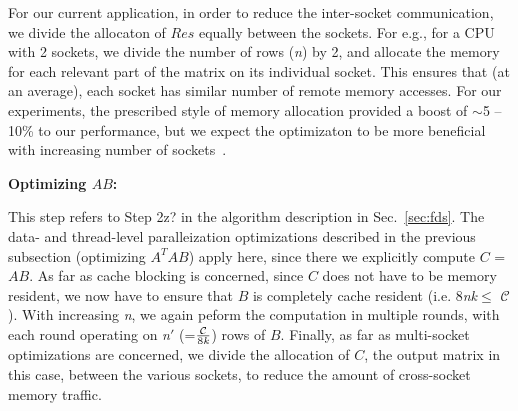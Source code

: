      For our current application, in order to reduce the inter-socket
     communication, we divide the allocaton of $Res$ equally between
     the sockets. For e.g., for a CPU with 2 sockets, we divide the
     number of rows ({\it{n}}) by 2, and allocate the memory for each
     relevant part of the matrix on its individual socket. This
     ensures that (at an average), each socket has similar number of
     remote memory accesses. For our experiments, the
     prescribed style of memory allocation provided a boost of
     $\sim$5 -- 10\% to our performance, but we expect the optimizaton
     to be more beneficial with increasing number of
     sockets~\cite{fdsfds}.
     
     







    




\vspace*{0.1in} 
{\bf{{ {Optimizing $AB$:}}}}

    This step refers to Step 2z? in the algorithm description in
    Sec.~\ref{sec:fds}. The data- and thread-level paralleization optimizations described 
    in the previous subsection (optimizing $A^TAB$) apply here, since
    there we explicitly  compute $C$ = $AB$. As far as cache blocking is
    concerned, since $C$ does not have to be memory resident, we now have
    to ensure that $B$ is completely cache resident (i.e. 8{\it{nk}}$\le$
    $\mathcal{C}$). With increasing {\it{n}}, we again peform the
    computation in multiple rounds, with each round operating on 
    {\it{ {\it{n}}$'$}} (=$\frac{\mathcal{C}}{8\it{k}}$) rows of $B$.
    Finally, as far as multi-socket optimizations are concerned, we
    divide the allocation of $C$, the output matrix in this case,
    between the various sockets, to reduce the amount of cross-socket
    memory traffic.




